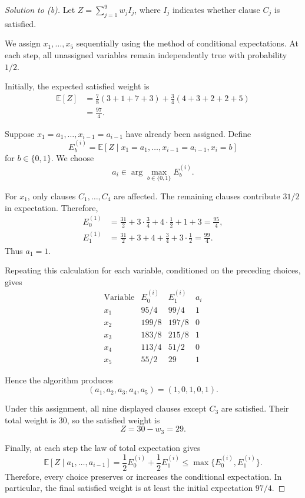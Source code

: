 \documentclass[11pt]{article}
\begin{document}
\begin{proof}[Solution to (b)]
    Let $Z=\sum_{j=1}^{9}w_jI_j$, where $I_j$
    indicates whether clause $C_j$ is satisfied.

    We assign $x_1,\ldots,x_5$ sequentially using
    the method of conditional expectations.
    At each step, all unassigned variables remain
    independently true with probability $1/2$.

    Initially, the expected satisfied weight is
    \[
        \begin{aligned}
            \mathbb E[Z]
            &= \frac78(3+1+7+3)
               +\frac34(4+3+2+2+5)\\
            &=\frac{97}{4}.
        \end{aligned}
    \]

    Suppose $x_1=a_1,\ldots,x_{i-1}=a_{i-1}$
    have already been assigned. Define
    \[
        E_b^{(i)}
        =\mathbb E[Z\mid
            x_1=a_1,\ldots,x_{i-1}=a_{i-1},x_i=b]
    \]
    for $b\in\{0,1\}$. We choose
    \[
        a_i\in\arg\max_{b\in\{0,1\}}E_b^{(i)}.
    \]

    For $x_1$, only clauses $C_1,\ldots,C_4$
    are affected. The remaining clauses contribute
    $31/2$ in expectation. Therefore,
    \[
        \begin{aligned}
            E_0^{(1)}
            &=\frac{31}{2}
                +3\cdot\frac34
                +4\cdot\frac12+1+3
              =\frac{95}{4},\\
            E_1^{(1)}
            &=\frac{31}{2}
                +3+4+\frac34+3\cdot\frac12
              =\frac{99}{4}.
        \end{aligned}
    \]
    Thus $a_1=1$.

    Repeating this calculation for each variable,
    conditioned on the preceding choices, gives
    \[
    \begin{array}{c|c|c|c}
        \text{Variable} & E_0^{(i)}
            & E_1^{(i)} & a_i\\ \hline
        x_1 & 95/4  & 99/4  & 1\\
        x_2 & 199/8 & 197/8 & 0\\
        x_3 & 183/8 & 215/8 & 1\\
        x_4 & 113/4 & 51/2  & 0\\
        x_5 & 55/2  & 29    & 1
    \end{array}
    \]

    Hence the algorithm produces
    \[
        (a_1,a_2,a_3,a_4,a_5)=(1,0,1,0,1).
    \]

    Under this assignment, all nine displayed
    clauses except $C_3$ are satisfied.
    Their total weight is $30$, so the satisfied
    weight is
    \[
        \boxed{Z=30-w_3=29}.
    \]

    Finally, at each step the law of total
    expectation gives
    \[
        \mathbb E[Z\mid a_1,\ldots,a_{i-1}]
        =\frac12 E_0^{(i)}+\frac12 E_1^{(i)}
        \leq \max\{E_0^{(i)},E_1^{(i)}\}.
    \]
    Therefore, every choice preserves or increases
    the conditional expectation. In particular,
    the final satisfied weight is at least the
    initial expectation $97/4$.
\end{proof}
\end{document}
